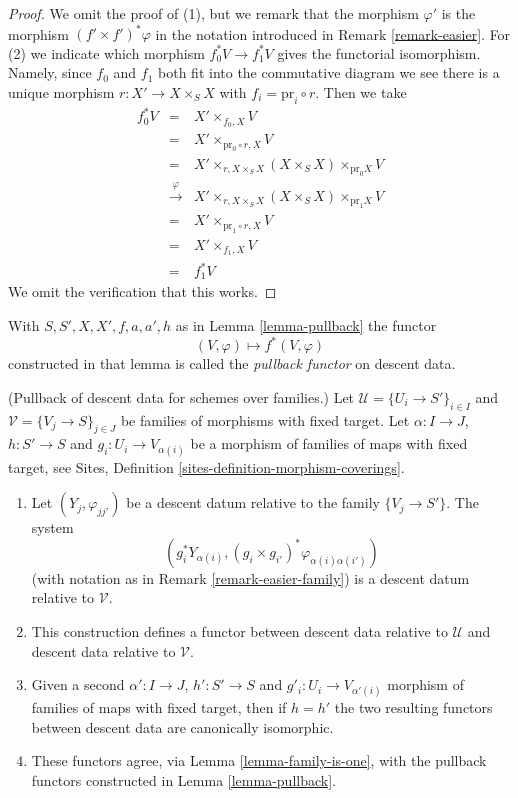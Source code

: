 \begin{proof}
We omit the proof of (1), but we remark that the morphism
$\varphi'$ is the morphism $(f' \times f')^*\varphi$ in the
notation introduced in Remark \ref{remark-easier}.
For (2) we indicate which morphism
$f_0^*V \to f_1^*V$ gives the functorial isomorphism. Namely,
since $f_0$ and $f_1$ both fit into the commutative diagram
we see there is a unique morphism $r : X' \to X \times_S X$
with $f_i = \text{pr}_i \circ r$. Then we take
\begin{eqnarray*}
f_0^*V & = &
X' \times_{f_0, X} V \\
& = &
X' \times_{\text{pr}_0 \circ r, X} V \\
& = &
X' \times_{r, X \times_S X} (X \times_S X) \times_{\text{pr}_0 X} V \\
& \xrightarrow{\varphi} &
X' \times_{r, X \times_S X} (X \times_S X) \times_{\text{pr}_1 X} V \\
& = &
X' \times_{\text{pr}_1 \circ r, X} V \\
& = &
X' \times_{f_1, X} V \\
& = & f_1^*V
\end{eqnarray*}
We omit the verification that this works.
\end{proof}

\begin{definition}
\label{definition-pullback-functor}
With $S, S', X, X', f, a, a', h$ as in Lemma \ref{lemma-pullback} the functor
$$
(V, \varphi) \longmapsto f^*(V, \varphi)
$$
constructed in that lemma is called the {\it pullback functor} on descent data.
\end{definition}

\begin{lemma}
\label{lemma-pullback-family}
(Pullback of descent data for schemes over families.)
Let $\mathcal{U} = \{U_i \to S'\}_{i \in I}$ and
$\mathcal{V} = \{V_j \to S\}_{j \in J}$ be families of morphisms with
fixed target. Let $\alpha : I \to J$, $h : S' \to S$ and
$g_i : U_i \to V_{\alpha(i)}$ be a morphism of families
of maps with fixed target, see
Sites, Definition \ref{sites-definition-morphism-coverings}.
\begin{enumerate}
\item Let $(Y_j, \varphi_{jj'})$ be a descent datum relative to the
family $\{V_j \to S'\}$. The system
$$
\left(
g_i^*Y_{\alpha(i)},
(g_i \times g_{i'})^*\varphi_{\alpha(i)\alpha(i')}
\right)
$$
(with notation as in Remark \ref{remark-easier-family})
is a descent datum relative to $\mathcal{V}$.
\item This construction defines a functor between descent data relative
to $\mathcal{U}$ and descent data relative to $\mathcal{V}$.
\item Given a second $\alpha' : I \to J$, $h' : S' \to S$ and
$g'_i : U_i \to V_{\alpha'(i)}$ morphism of families
of maps with fixed target, then if $h = h'$ the two resulting functors
between descent data are canonically isomorphic.
\item These functors agree, via Lemma \ref{lemma-family-is-one},
with the pullback functors constructed in Lemma \ref{lemma-pullback}.
\end{enumerate}
\end{lemma}

